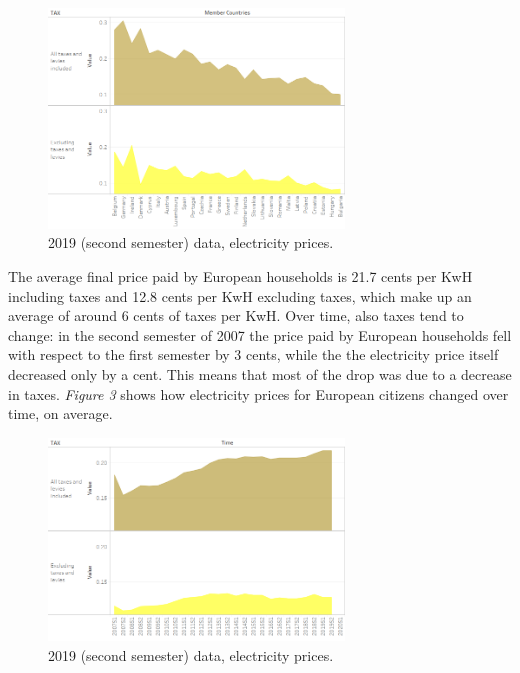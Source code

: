 \documentclass{book}
\begin{document}
\bigskip
\begin{figure}[H]
\begin{center}
\captionsetup{justification=centering}
\includegraphics[width=0.7\textwidth]{Images/Taxes.png}
\caption{2019 (second semester) data, electricity prices. }
\end{center}
\end{figure}
\bigskip

The average final price paid by European households is 21.7 cents per KwH including taxes and 12.8 cents per KwH excluding taxes, which make up an average of around 6 cents of taxes per KwH. Over time, also taxes tend to change: in the second semester of 2007 the price paid by European households fell with respect to the first semester by 3 cents, while the the electricity price itself decreased only by a cent. This means that most of the drop was due to a decrease in taxes. \textit{Figure 3} shows how electricity prices for European citizens changed over time, on average.

\bigskip
\begin{figure}[H]
\begin{center}
\captionsetup{justification=centering}
\includegraphics[width=0.7\textwidth]{Images/TaxesTime.png}
\caption{2019 (second semester) data, electricity prices. }
\end{center}
\end{figure}
\bigskip
\end{document}
